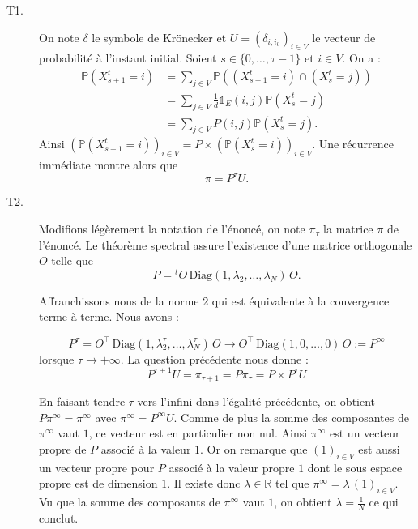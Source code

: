 \documentclass[11pt]{article}
\newcommand{\R}{\mathbb{R}}
\renewcommand{\P}{\mathbb{P}}
\newcommand{\ind}{\mathds{1}}
\theoremstyle{plain}
\begin{document}
\begin{description}
    \item[T1.\label{q:t1}] On note $\delta$ le symbole de Krönecker et $U = (\delta_{i,i_0})_{i \in V}$ le vecteur de probabilité à l'instant initial. Soient $s \in \{0, \ldots, \tau - 1\}$ et $i \in V$. On a :
    \begin{align*}
    \P(X_{s+1}^{t} = i) & = \sum_{j \in V} \P((X_{s+1}^{t} = i) \cap (X_{s}^{t} = j))\\
    & = \sum_{j \in V}  \frac{1}{d}\ind_{E}(i,j) \P (X_{s}^{t} = j)\\
    & = \sum_{j \in V} P(i,j)\P (X_{s}^{t} = j).
    \end{align*}
    Ainsi $\left(\P(X_{s+1}^{t} = i)\right)_{i \in V} = P \times (\P(X_{s}^{t} = i))_{i \in V}$. Une récurrence immédiate montre alors que
    \begin{equation}\label{eq:t1}
    \pi = P^{\tau}U.
    \end{equation}

    \item[T2.\label{q:t2}] Modifions légèrement la notation de l'énoncé, on note $\pi_\tau$ la matrice $\pi$ de l'énoncé. Le théorème spectral assure l'existence d'une matrice orthogonale $O$ telle que
    \begin{equation*}\label{eq:diagonalisation}
    P = {}^{t}O \,\mathrm{Diag}(1,\lambda_2, \ldots, \lambda_N)\, O.
    \end{equation*}
     
    Affranchissons nous de la norme $2$ qui est équivalente à la convergence terme à terme. Nous avons :
    
    \begin{equation*}\label{eq:limite_P}
        P^{\tau} = O^\top \, \mathrm{Diag}(1, \lambda_2^\tau, \ldots, \lambda_N^\tau)\, O 
        \to 
        O^\top \,\mathrm{Diag}(1,0, \ldots, 0)\, O := P^{\infty}
    \end{equation*}
    lorsque $\tau \to +\infty$.
    La question précédente nous donne :
    $$
        P^{\tau + 1}U = \pi_{\tau + 1} = P\pi_\tau = P \times P^\tau U
    $$

    En faisant tendre $\tau$ vers l'infini dans l'égalité précédente, on obtient $P\pi^{\infty} = \pi^\infty$ avec $\pi^\infty = P^\infty U$. Comme de plus la somme des composantes de $\pi^\infty$ vaut $1$, ce vecteur est en particulier non nul. Ainsi $\pi^\infty$ est un vecteur propre de $P$ associé à la valeur $1$. Or on remarque que $(1)_{i\in V}$ est aussi un vecteur propre pour $P$ associé à la valeur propre $1$ dont le sous espace propre est de dimension $1$. 
    Il existe donc $\lambda \in \R$ tel que $\pi^\infty = \lambda \, (1)_{i\in V}$. Vu que la somme des composants de $\pi^\infty$ vaut $1$, on obtient $\lambda = \frac{1}{N}$ ce qui conclut.
    

\end{description}
\end{document}
